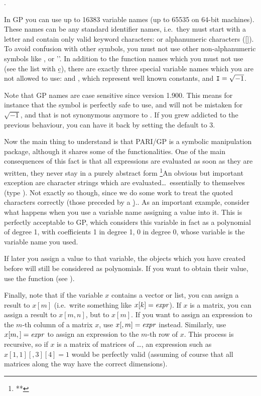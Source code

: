 .

  In GP you can use up to 16383 variable names (up to 65535 on 64-bit
machines). These names can be any standard identifier names, i.e.~they must
start with a letter and contain only valid keyword characters: \kbd{\_} or
alphanumeric characters ([]). To avoid confusion with other
symbols, you must not use other non-alphanumeric symbols like \kbd{\$}, or
''. In addition to the function names which you must not use (see the
list with \b{c}), there are exactly three special variable names which you
are not allowed to use:  and , which represent well known
constants, and ${\tt I}=\sqrt{-1}$.

Note that GP names are case sensitive since version 1.900. This means for
instance that the symbol  is perfectly safe to use, and will not be
mistaken for $\sqrt{-1}$, and that  is not synonymous anymore to
. If you grew addicted to the previous behaviour, you can have it back
by setting the default  to $3$.

  Now the main thing to understand is that PARI/GP is  a symbolic
manipulation package, although it shares some of the functionalities. One of
the main consequences of this fact is that all expressions are evaluated as
soon as they are written, they never stay in a purely abstract form%
\footnote{**}{An obvious but important exception are character strings which
are evaluated\dots\ essentially to themselves (type ). Not exactly
so though, since we do some work to treat the quoted characters correctly
(those preceded by a \b{)}.}.
%
As an important example, consider what happens when you use a variable name
 assigning a value into it. This is perfectly acceptable to GP,
which considers this variable in fact as a polynomial of degree 1, with
coefficients 1 in degree 1, 0 in degree 0, whose variable is the variable
name you used.

  If later you assign a value to that variable, the objects which you have
created before will still be considered as polynomials. If you want to obtain
their value, use the function  (see ).

  Finally, note that if the variable $x$ contains a vector or list, you can
assign a result to $x[m]$ (i.e.~write something like $x[k]=\hbox{\it expr\/}$). If
$x$ is a matrix, you can assign a result to $x[m,n]$, but  to
$x[m]$. If you want to assign an expression to the $m$-th column of a matrix
$x$, use $x[,m]=\hbox{\it expr\/}$ instead. Similarly, use $x[m,]=\hbox{\it expr\/}$ to
assign an expression to the $m$-th row of $x$. This process is recursive, so
if $x$ is a matrix of matrices of \dots, an expression such as
$x[1,1][,3][4]=1$ would be perfectly valid (assuming of course that all
matrices along the way have the correct dimensions).


